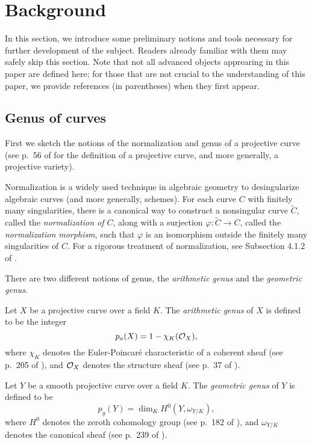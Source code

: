 \section{Background}
\label{sec:pre}

In this section, we introduce some preliminary notions and tools
necessary for further development of the subject. Readers already
familiar with them may safely skip this section. Note that not all
advanced objects apprearing in this paper are defined here; for those
that are not crucial to the understanding of this paper, we provide
references (in parentheses) when they first appear.

\subsection{Genus of curves}

First we sketch the notions of the normalization and genus of a
projective curve (see p.~56 of \cite{MR1917232} for the definition of
a projective curve, and more generally, a projective variety).

Normalization is a widely used technique in algebraic geometry to
desingularize algebraic curves (and more generally, schemes). For each
curve $C$ with finitely many singularities, there is a canonical way
to construct a nonsingular curve $\tilde{C}$, called the
\emph{normalization of $C$}, along with a surjection $\varphi:
\tilde{C} \to C$, called the \emph{normalization morphism}, such that
$\varphi$ is an isomorphism outside the finitely many singularities of
$C$. For a rigorous treatment of normalization, see Subsection 4.1.2
of \cite{MR1917232}.

There are two different notions of genus, the \emph{arithmetic genus}
and the \emph{geometric genus}.

\begin{definition}
  Let $X$ be a projective curve over a field $K$. The \emph{arithmetic
    genus} of $X$ is defined to be the integer
  \[
  p_a(X) = 1 - \chi_K(\mathcal{O}_X),
  \]
  where $\chi_K$ denotes the Euler-Poincar\'e characteristic of a
  coherent sheaf (see p.~205 of \cite{MR1917232}), and $\mathcal{O}_X$ denotes
  the structure sheaf (see p.~37 of \cite{MR1917232}).
\end{definition}

\begin{definition}
  Let $Y$ be a smooth projective curve over a field $K$. The
  \emph{geometric genus} of $Y$ is defined to be
  \[
  p_g(Y) = \dim_K H^0(Y, \omega_{Y/K}),
  \]
  where $H^0$ denotes the zeroth cohomology group (see p.~182 of
  \cite{MR1917232}), and $\omega_{Y/K}$ denotes the canonical sheaf
  (see p.~239 of \cite{MR1917232}).
\end{definition}

